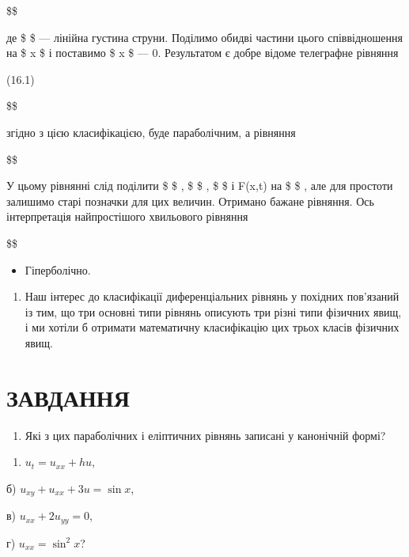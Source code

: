 \documentclass[
  ukrainian,
]{article}
\providecommand{\tightlist}{%
  \setlength{\itemsep}{0pt}\setlength{\parskip}{0pt}}
\begin{document}
\$\$

де \$ \rho \$ --- лінійна густина струни. Поділимо обидві частини цього
співвідношення на \$ \Delta x \$ і поставимо \$ \Delta x \$ --- 0.
Результатом є добре відоме телеграфне рівняння

(16.1)

\$\$

згідно з цією класифікацією, буде параболічним, а рівняння

\$\$

У цьому рівнянні слід поділити \$ \alpha \$ , \$ \beta \$ , \$ \gamma \$
і F(x,t) на \$ \rho \$ , але для простоти залишимо старі позначки для
цих величин. Отримано бажане рівняння. Ось інтерпретація найпростішого
хвильового рівняння

\$\$

\begin{itemize}
\tightlist
\item
  Гіперболічно.
\end{itemize}

\begin{enumerate}
\def\labelenumi{\arabic{enumi}.}
\setcounter{enumi}{1}
\tightlist
\item
  Наш інтерес до класифікації диференціальних рівнянь у похідних
  пов'язаний із тим, що три основні типи рівнянь описують три різні типи
  фізичних явищ, і ми хотіли б отримати математичну класифікацію цих
  трьох класів фізичних явищ.
\end{enumerate}

\section{ЗАВДАННЯ}\label{ux437ux430ux432ux434ux430ux43dux43dux44f-11}

\begin{enumerate}
\def\labelenumi{\arabic{enumi}.}
\tightlist
\item
  Які з цих параболічних і еліптичних рівнянь записані у канонічній
  формі?
\end{enumerate}

\begin{enumerate}
\def\labelenumi{\alph{enumi})}
\tightlist
\item
  \(u_t = u_{xx} + hu\),
\end{enumerate}

б) \(u_{xy} + u_{xx} + 3u = \sin x\),

в) \(u_{xx} + 2u_{yy} = 0\),

г) \(u_{xx} = \sin^2 x\)?
\end{document}
